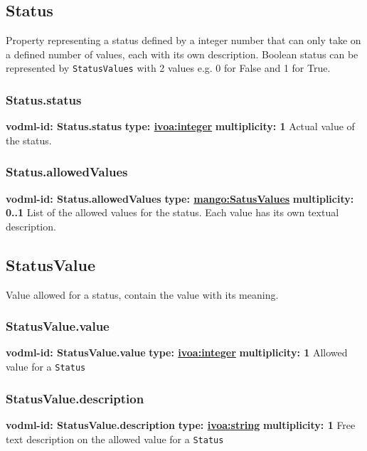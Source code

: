   \subsection{Status}
  \label{sect:Status}
    Property representing a status defined by a integer number that can only take on a defined number of values, each with its own description. Boolean status can be represented by \texttt{StatusValues} with 2 values e.g. 0 for False and 1 for True.

    \subsubsection{Status.status}
      \textbf{vodml-id: Status.status} \newline
      \textbf{type: \hyperref[sect:ivoa]{ivoa:integer}} \newline
      \textbf{multiplicity: 1} \newline 
      Actual value of the status.

    \subsubsection{Status.allowedValues}
      \textbf{vodml-id: Status.allowedValues} \newline
      \textbf{type: \hyperref[sect:SatusValues]{mango:SatusValues}} \newline
      \textbf{multiplicity: 0..1} \newline 
      List of the allowed values for the status. Each value has its own textual description.

  \subsection{StatusValue}
  \label{sect:StatusValue}
    Value allowed for a status, contain the value with its meaning.

    \subsubsection{StatusValue.value}
      \textbf{vodml-id: StatusValue.value} \newline
      \textbf{type: \hyperref[sect:ivoa]{ivoa:integer}} \newline
      \textbf{multiplicity: 1} \newline 
      Allowed value for a \texttt{Status}

    \subsubsection{StatusValue.description}
      \textbf{vodml-id: StatusValue.description} \newline
      \textbf{type: \hyperref[sect:ivoa]{ivoa:string}} \newline
      \textbf{multiplicity: 1} \newline 
      Free text description on the allowed value for a \texttt{Status}

